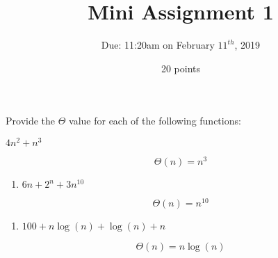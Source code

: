 \documentclass[12pt]{article}
\begin{document}
 
\title{Mini Assignment 1}
\author{Due: 11:20am on February $11^{th}$, 2019}
\date{20 points}
\maketitle

Provide the $\Theta$ value for each of the following functions:

\begin{enumerate}[label={[\arabic*]}]
    \item $4n^2 + n^3$
\end{enumerate}
$$\Theta(n) = n^{3}$$
\begin{enumerate}[resume*]
	\item $6n + 2^n + 3n^{10}$
\end{enumerate}
$$\Theta(n) = n^{10}$$
\begin{enumerate}[resume*]
	\item $100 + n\log(n) + \log(n) + n$
\end{enumerate}
$$\Theta(n) = n\log(n)$$
\end{document}
